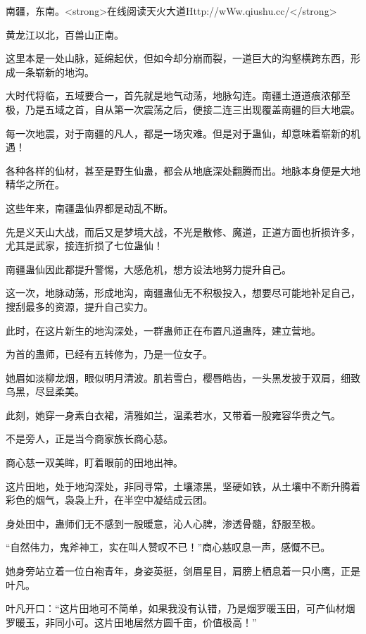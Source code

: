 
\begin{this_body}

南疆，东南。<strong>在线阅读天火大道Http://wWw.qiushu.cc/</strong>

黄龙江以北，百兽山正南。

这里本是一处山脉，延绵起伏，但如今却分崩而裂，一道巨大的沟壑横跨东西，形成一条崭新的地沟。

大时代将临，五域要合一，首先就是地气动荡，地脉勾连。南疆土道道痕浓郁至极，乃是五域之首，自从第一次震荡之后，便接二连三出现覆盖南疆的巨大地震。

每一次地震，对于南疆的凡人，都是一场灾难。但是对于蛊仙，却意味着崭新的机遇！

各种各样的仙材，甚至是野生仙蛊，都会从地底深处翻腾而出。地脉本身便是大地精华之所在。

这些年来，南疆蛊仙界都是动乱不断。

先是义天山大战，而后又是梦境大战，不光是散修、魔道，正道方面也折损许多，尤其是武家，接连折损了七位蛊仙！

南疆蛊仙因此都提升警惕，大感危机，想方设法地努力提升自己。

这一次，地脉动荡，形成地沟，南疆蛊仙无不积极投入，想要尽可能地补足自己，搜刮最多的资源，提升自己实力。

此时，在这片新生的地沟深处，一群蛊师正在布置凡道蛊阵，建立营地。

为首的蛊师，已经有五转修为，乃是一位女子。

她眉如淡柳龙烟，眼似明月清波。肌若雪白，樱唇皓齿，一头黑发披于双肩，细致乌黑，尽显柔美。

此刻，她穿一身素白衣裙，清雅如兰，温柔若水，又带着一股雍容华贵之气。

不是旁人，正是当今商家族长商心慈。

商心慈一双美眸，盯着眼前的田地出神。

这片田地，处于地沟深处，非同寻常，土壤漆黑，坚硬如铁，从土壤中不断升腾着彩色的烟气，袅袅上升，在半空中凝结成云团。

身处田中，蛊师们无不感到一股暖意，沁人心脾，渗透骨髓，舒服至极。

“自然伟力，鬼斧神工，实在叫人赞叹不已！”商心慈叹息一声，感慨不已。

她身旁站立着一位白袍青年，身姿英挺，剑眉星目，肩膀上栖息着一只小鹰，正是叶凡。

叶凡开口：“这片田地可不简单，如果我没有认错，乃是烟罗暖玉田，可产仙材烟罗暖玉，非同小可。这片田地居然方圆千亩，价值极高！”


\end{this_body}
